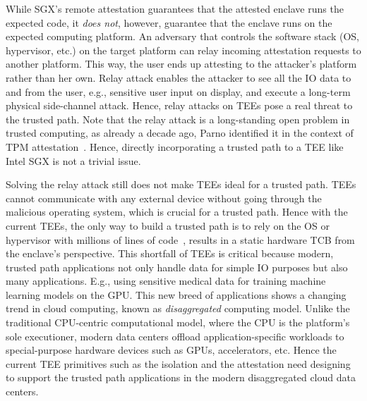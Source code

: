 While SGX's remote attestation guarantees that the attested enclave runs the expected code, it \emph{does not}, however, guarantee that the enclave runs on the expected computing platform. An adversary that controls the software stack (OS, hypervisor, etc.) on the target platform can relay incoming attestation requests to another platform. This way, the user ends up attesting to the attacker's platform rather than her own. Relay attack enables the attacker to see all the IO data to and from the user, e.g., sensitive user input on display, and execute a long-term physical side-channel attack. Hence, relay attacks on TEEs pose a real threat to the trusted path. Note that the relay attack is a long-standing open problem in trusted computing, as already a decade ago, Parno identified it in the context of TPM attestation~\cite{parno2008bootstrapping}. Hence, directly incorporating a trusted path to a TEE like Intel SGX is not a trivial issue.


Solving the relay attack still does not make TEEs ideal for a trusted path. TEEs cannot communicate with any external device without going through the malicious operating system, which is crucial for a trusted path. Hence with the current TEEs, the only way to build a trusted path is to rely on the OS or hypervisor with millions of lines of code~\cite{torvalds2020linux,barham2003xen}, results in a static hardware TCB from the enclave's perspective. This shortfall of TEEs is critical because modern, trusted path applications not only handle data for simple IO purposes but also many applications. E.g., using sensitive medical data for training machine learning models on the GPU. This new breed of applications shows a changing trend in cloud computing, known as \emph{disaggregated} computing model. Unlike the traditional CPU-centric computational model, where the CPU is the platform's sole executioner, modern data centers offload application-specific workloads to special-purpose hardware devices such as GPUs, accelerators, etc. Hence the current TEE primitives such as the isolation and the attestation need designing to support the trusted path applications in the modern disaggregated cloud data centers.   


